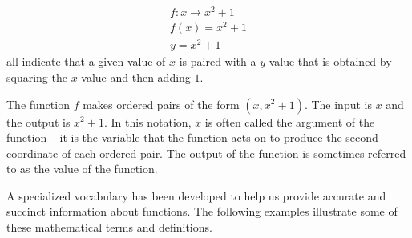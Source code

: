\documentclass[10pt,]{book}
\theoremstyle{ptxdefinitionnotitle}
\theoremstyle{ptxdefinitiontitle}
\numberwithin{equation}{section}
\begin{document}
\begin{gather*}
f: x \rightarrow x^2 + 1\\
f(x) = x^2 + 1\\
y = x^2 + 1
\end{gather*}
all indicate that a given value of \(x\) is paired with a \(y\)-value that is obtained by squaring the \(x\)-value and then adding \(1\).%
\par
\hypertarget{p-22}{}%
The function \(f\) makes ordered pairs of the form \(\left(x, x^2+1 \right)\). The input is \(x\) and the output is \(x^2 + 1\).  In this notation, \(x\) is often called the argument of the function -- it is the variable that the function acts on to produce the second coordinate of each ordered pair.  The output of the function is sometimes referred to as the value of the function.%
\par
\hypertarget{p-23}{}%
A specialized vocabulary has been developed to help us provide accurate and succinct information about functions. The following examples illustrate some of these mathematical terms and definitions.%
\end{document}
